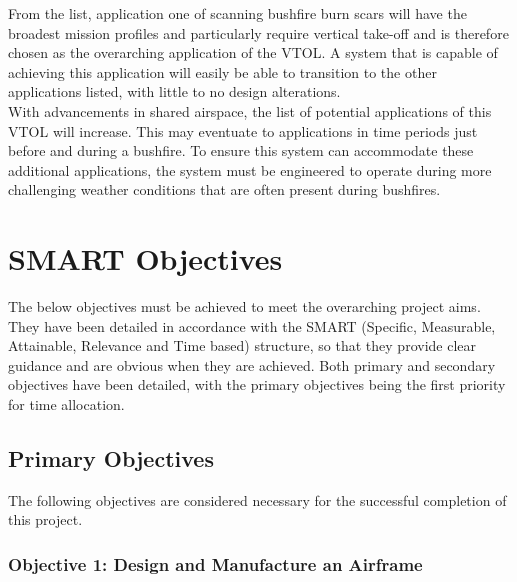 \begin{appendices}
From the list, application one of scanning bushfire burn scars will have the broadest mission profiles and particularly require vertical take-off and is therefore chosen as the overarching application of the VTOL. A system that is capable of achieving this application will easily be able to transition to the other applications listed, with little to no design alterations. \\

With advancements in shared airspace, the list of potential applications of this VTOL will increase. This may eventuate to applications in time periods just before and during a bushfire. To ensure this system can accommodate these additional applications, the system must be engineered to operate during more challenging weather conditions that are often present during bushfires. 

\clearpage
\newpage

\section{SMART Objectives}
\label{app_smart}
The below objectives must be achieved to meet the overarching project aims. They have been detailed in accordance with the SMART (Specific, Measurable, Attainable, Relevance and Time based) structure, so that they provide clear guidance and are obvious when they are achieved. Both primary and secondary objectives have been detailed, with the primary objectives being the first priority for time allocation. 

\subsection{Primary Objectives}

The following objectives are considered necessary for the successful completion of this project.

\subsubsection{Objective 1: Design and Manufacture an Airframe}


\end{appendices}
